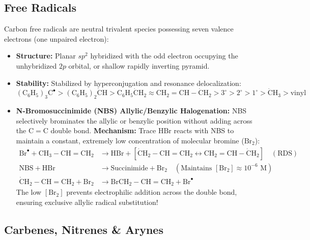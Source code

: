 \documentclass[10pt,a4paper]{article}
\begin{document}
\subsection{Free Radicals}

\begin{conceptbox}
Carbon free radicals are neutral trivalent species possessing seven valence electrons (one unpaired electron):
\begin{itemize}
  \item \textbf{Structure:} Planar $sp^2$ hybridized with the odd electron occupying the unhybridized $2p$ orbital, or shallow rapidly inverting pyramid.
  \item \textbf{Stability:} Stabilized by hyperconjugation and resonance delocalization:
  \begin{equation}
    \mathrm{(C_6H_5)_3C^\bullet} > \mathrm{(C_6H_5)_2\dot{C}H} > \mathrm{C_6H_5\dot{C}H_2} \approx \mathrm{CH_2=CH-\dot{C}H_2} > 3^\circ > 2^\circ > 1^\circ > \mathrm{\dot{C}H_3} > \text{vinyl}
  \end{equation}
  \item \textbf{N-Bromosuccinimide (NBS) Allylic/Benzylic Halogenation:}
  NBS selectively brominates the allylic or benzylic position without adding across the $\mathrm{C=C}$ double bond.
  \textbf{Mechanism:} Trace $\mathrm{HBr}$ reacts with NBS to maintain a constant, extremely low concentration of molecular bromine ($\mathrm{Br_2}$):
  \begin{align}
    \mathrm{Br}^\bullet + \mathrm{CH_3-CH=CH_2} &\longrightarrow \mathrm{HBr} + [\mathrm{\dot{C}H_2-CH=CH_2} \longleftrightarrow \mathrm{CH_2=CH-\dot{C}H_2}] \quad (\text{RDS})\\
    \mathrm{NBS} + \mathrm{HBr} &\longrightarrow \text{Succinimide} + \mathrm{Br_2} \quad (\text{Maintains } [\mathrm{Br_2}] \approx 10^{-6}\text{ M})\\
    \mathrm{\dot{C}H_2-CH=CH_2} + \mathrm{Br_2} &\longrightarrow \mathrm{BrCH_2-CH=CH_2} + \mathrm{Br}^\bullet
  \end{align}
  The low $[\mathrm{Br_2}]$ prevents electrophilic addition across the double bond, ensuring exclusive allylic radical substitution!
\end{itemize}
\end{conceptbox}

\subsection{Carbenes, Nitrenes \& Arynes}
\end{document}
